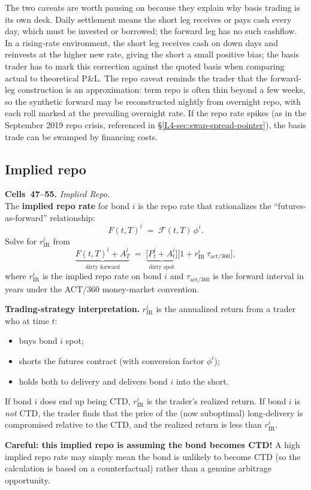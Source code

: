 The two caveats are worth pausing on because they explain why basis
trading is its own desk. Daily settlement means the short leg receives or
pays cash every day, which must be invested or borrowed; the forward leg
has no such cashflow. In a rising-rate environment, the short leg receives
cash on down days and reinvests at the higher new rate, giving the short
a small positive bias; the basis trader has to mark this correction
against the quoted basis when comparing actual to theoretical P\&L. The
repo caveat reminds the trader that the forward-leg construction is an
approximation: term repo is often thin beyond a few weeks, so the
synthetic forward may be reconstructed nightly from overnight repo, with
each roll marked at the prevailing overnight rate. If the repo rate
spikes (as in the September 2019 repo crisis, referenced in
\S\ref{L4-sec:swap-spread-pointer}), the basis trade can be swamped by
financing costs.

\subsection{Implied repo}\label{L4-sec:tf-impliedrepo}

\begin{keyblock}
\textbf{Cells~47--55.} \emph{Implied Repo.}\\
The \textbf{implied repo rate} for bond $i$ is the repo rate that
rationalizes the ``futures-as-forward'' relationship:
\[
   F(t,T)^i \;=\; \mathcal{F}(t,T)\,\phi^i.
\]
Solve for $r^i_{\text{IR}}$ from
\[
   \underbrace{F(t,T)^i + A^i_T}_{\text{dirty forward}}
     \;=\; \underbrace{\bigl[P^i_t + A^i_t\bigr]}_{\text{dirty spot}}
        \bigl[1 + r^i_{\text{IR}}\,\tau_{\text{act}/360}\bigr],
\]
where $r^i_{\text{IR}}$ is the implied repo rate on bond $i$ and
$\tau_{\text{act}/360}$ is the forward interval in years under the
ACT/360 money-market convention.

\textbf{Trading-strategy interpretation.} $r^i_{\text{IR}}$ is the
annualized return from a trader who at time $t$:
\begin{itemize}
  \item buys bond $i$ spot;
  \item shorts the futures contract (with conversion factor $\phi^i$);
  \item holds both to delivery and delivers bond $i$ into the short.
\end{itemize}
If bond $i$ does end up being CTD, $r^i_{\text{IR}}$ is the trader's
realized return. If bond $i$ is \emph{not} CTD, the trader finds that
the price of the (now suboptimal) long-delivery is compromised relative
to the CTD, and the realized return is less than $r^i_{\text{IR}}$.

\textbf{Careful: this implied repo is assuming the bond becomes CTD!} A
high implied repo rate may simply mean the bond is unlikely to become
CTD (so the calculation is based on a counterfactual) rather than a
genuine arbitrage opportunity.
\end{keyblock}

